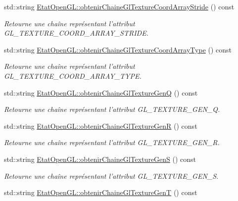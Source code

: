 \begin{DoxyCompactItemize}
std\-::string \hyperlink{group__utilitaire_ga0cef5f78ea9815fc83b519aff2694d5b}{Etat\-Open\-G\-L\-::obtenir\-Chaine\-Gl\-Texture\-Coord\-Array\-Stride} () const 
\begin{DoxyCompactList}\small\item\em Retourne une chaîne représentant l'attribut G\-L\-\_\-\-T\-E\-X\-T\-U\-R\-E\-\_\-\-C\-O\-O\-R\-D\-\_\-\-A\-R\-R\-A\-Y\-\_\-\-S\-T\-R\-I\-D\-E. \end{DoxyCompactList}\item 
std\-::string \hyperlink{group__utilitaire_ga6cae6d3addddcf37939f5543fffab86f}{Etat\-Open\-G\-L\-::obtenir\-Chaine\-Gl\-Texture\-Coord\-Array\-Type} () const 
\begin{DoxyCompactList}\small\item\em Retourne une chaîne représentant l'attribut G\-L\-\_\-\-T\-E\-X\-T\-U\-R\-E\-\_\-\-C\-O\-O\-R\-D\-\_\-\-A\-R\-R\-A\-Y\-\_\-\-T\-Y\-P\-E. \end{DoxyCompactList}\item 
std\-::string \hyperlink{group__utilitaire_ga2bc696d575361d0668e25ab8f8455c21}{Etat\-Open\-G\-L\-::obtenir\-Chaine\-Gl\-Texture\-Gen\-Q} () const 
\begin{DoxyCompactList}\small\item\em Retourne une chaîne représentant l'attribut G\-L\-\_\-\-T\-E\-X\-T\-U\-R\-E\-\_\-\-G\-E\-N\-\_\-\-Q. \end{DoxyCompactList}\item 
std\-::string \hyperlink{group__utilitaire_ga232ca6071605477892ccd38781f48b53}{Etat\-Open\-G\-L\-::obtenir\-Chaine\-Gl\-Texture\-Gen\-R} () const 
\begin{DoxyCompactList}\small\item\em Retourne une chaîne représentant l'attribut G\-L\-\_\-\-T\-E\-X\-T\-U\-R\-E\-\_\-\-G\-E\-N\-\_\-\-R. \end{DoxyCompactList}\item 
std\-::string \hyperlink{group__utilitaire_gac92ef30b356fe2de552d88b455aa0b20}{Etat\-Open\-G\-L\-::obtenir\-Chaine\-Gl\-Texture\-Gen\-S} () const 
\begin{DoxyCompactList}\small\item\em Retourne une chaîne représentant l'attribut G\-L\-\_\-\-T\-E\-X\-T\-U\-R\-E\-\_\-\-G\-E\-N\-\_\-\-S. \end{DoxyCompactList}\item 
std\-::string \hyperlink{group__utilitaire_gaa225300590e106cd32d3a011d1ff6599}{Etat\-Open\-G\-L\-::obtenir\-Chaine\-Gl\-Texture\-Gen\-T} () const 

\end{DoxyCompactItemize}
